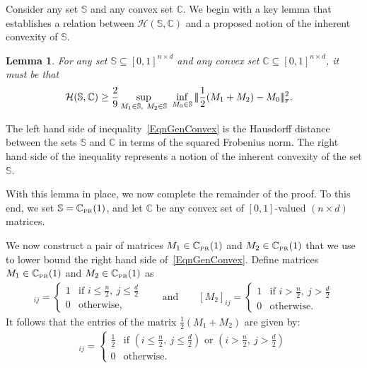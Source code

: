 \documentclass[11pt, hidelinks]{article} %
\newtheorem{lemma}{Lemma}
\newcommand{\matsnorm}[2]{|\!|\!| #1 | \! | \!|_{{#2}}}
\newcommand{\frobnorm}[1]{\ensuremath{\matsnorm{#1}{\mbox{\tiny{F}}}}}
\newcommand{\hausDis}{\mathcal{H}}
\newcommand{\numrows}{n}
\newcommand{\numcols}{d}
\newcommand{\wtmatrix}{M}
\newcommand{\wt}{\wtmatrix}
\newcommand{\matrixset}{\mathbb{C}}
\newcommand{\permset}{\matrixset_{\mbox{\tiny PR}}}
\newcommand{\permone}{\permset(1)}
\newcommand{\convexclass}{\ensuremath{\mathbb{C}}}
\newcommand{\genclass}{\ensuremath{\mathbb{S}}}
\begin{document}
Consider any set $\genclass$ and any convex set $\convexclass$.  We
begin with a key lemma that establishes a relation between $\hausDis(\genclass, \convexclass)$ and a proposed
notion of the inherent convexity of $\genclass$.
\begin{lemma}
For any set $\genclass \subseteq [0,1]^{\numrows \times \numcols}$ and
any convex set $\convexclass\subseteq [0,1]^{\numrows \times   \numcols}$, it must be that
%
\begin{align}
\hausDis(\genclass, \convexclass) & \geq \frac{2}{9} \sup \limits_{\wt_1
  \in \genclass,\ \wt_2 \in \genclass} ~ \inf \limits_{\wt_0 \in
  \genclass} \frobnorm{\frac{1}{2} (\wt_1 + \wt_2) - \wt_0}^2.
	\label{EqnGenConvex}
\end{align}	
	\label{LemNoconvex}
\end{lemma}
The left hand side of inequality~\eqref{EqnGenConvex} is the Hausdorff
distance between the sets $\genclass$ and $\convexclass$ in terms of
the squared Frobenius norm. The right hand side of the inequality
represents a notion of the inherent convexity of the set $\genclass$.

With this lemma in place, we now complete the remainder of the
proof. To this end, we set $\genclass = \permone$, and let
$\convexclass$ be any convex set of $[0,1]$-valued $(\numrows \times
\numcols)$ matrices.

We now construct a pair of matrices $\wt_1 \in \permone$ and $\wt_2
\in \permone$ that we use to lower bound the right hand side
of~\eqref{EqnGenConvex}. Define matrices $\wt_1 \in \permone$ and $\wt_2 \in \permone$ as
\begin{align*}
[\wt_1]_{ij} = 
\begin{cases}
1 & \mbox{if } i \leq \frac{\numrows}{2},\ j \leq
\frac{\numcols}{2}\\ 0 & \mbox{otherwise},
\end{cases} \qquad \text{and} \qquad
[\wt_2]_{ij} =
\begin{cases}
1 & \mbox{if } i > \frac{\numrows}{2},\ j > \frac{\numcols}{2}\\ 0 &
\mbox{otherwise}.
\end{cases}
\end{align*}
It follows that the entries of the matrix $\frac{1}{2}(\wt_1 + \wt_2)$
are given by:
\begin{align*}
[\frac{1}{2}(\wt_1 + \wt_2)]_{ij} = 
\begin{cases}
\frac{1}{2} & \mbox{if } (i \leq \frac{\numrows}{2},\ j \leq
\frac{\numcols}{2}) \mbox{~or~} (i > \frac{\numrows}{2},\ j >
\frac{\numcols}{2}) \\ 0 & \mbox{otherwise}.
\end{cases}
\end{align*}
\end{document}
